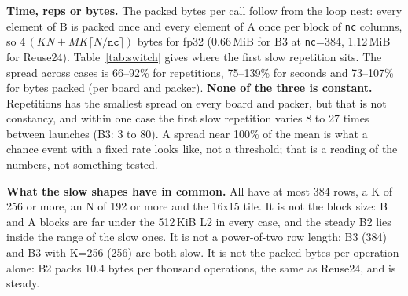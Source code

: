 \documentclass[11pt,a4paper]{article}
\begin{document}
\textbf{Time, reps or bytes.} The packed bytes per call follow from the loop nest: every element of B is packed once and
every element of A once per block of \texttt{nc} columns, so \(4\,(K N + M K \lceil N/\texttt{nc} \rceil)\) bytes
for fp32 (0.66\,MiB for B3 at \texttt{nc}=384, 1.12\,MiB for Reuse24). Table~\ref{tab:switch} gives where the first
slow repetition sits. The spread across cases is 66--92\% for repetitions, 75--139\% for seconds and 73--107\% for bytes packed
(per board and packer). \textbf{None of the three is constant.} Repetitions has the smallest spread on every board and packer, but that is not
constancy, and within one case the first slow repetition varies 8 to 27 times between launches (B3: 3 to 80).
A spread near 100\% of the mean is what a chance event with a fixed rate looks like, not a threshold; that is a reading of
the numbers, not something tested.

\begin{table}[h]
\centering\small
{}
\caption{Where the first slow repetition sits. \#47, \texttt{jbpi}, vector packer unless stated, uninstrumented, core 4.}
\label{tab:switch}
\end{table}

\textbf{What the slow shapes have in common.} All have at most 384 rows, a K of 256 or more, an N of 192 or more and the 16x15
tile. It is not the block size: B and A blocks are far under the 512\,KiB L2 in every case, and the steady B2 lies inside the
range of the slow ones. It is not a power-of-two row length: B3 (384) and B3 with K=256 (256) are both slow. It is not the
packed bytes per operation alone: B2 packs 10.4 bytes per thousand operations, the same as Reuse24, and is steady.
\end{document}
